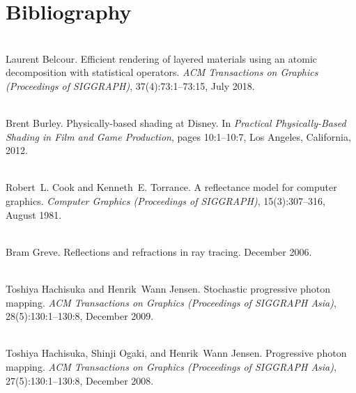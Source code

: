 \chapter{Bibliography}
\hypertarget{citelist}{}\label{citelist}

\begin{DoxyDescription}
\item[\label{citelist_CITEREF_Belcour:2018:Efficient}%
\Hypertarget{citelist_CITEREF_Belcour:2018:Efficient}%
\mbox{[}1\mbox{]}]\hfill \\
Laurent Belcour. Efficient rendering of layered materials using an atomic decomposition with statistical operators. {\itshape ACM Transactions on Graphics (Proceedings of SIGGRAPH)}, 37(4)\+:73\+:1--73\+:15, July 2018. 


\item[\label{citelist_CITEREF_Burley:2012:Physicallybased}%
\Hypertarget{citelist_CITEREF_Burley:2012:Physicallybased}%
\mbox{[}2\mbox{]}]\hfill \\
Brent Burley. Physically-\/based shading at Disney. In {\itshape Practical Physically-\/\+Based Shading in Film and Game Production}, pages 10\+:1--10\+:7, Los Angeles, California, 2012.


\item[\label{citelist_CITEREF_Cook:1981:Reflectance}%
\Hypertarget{citelist_CITEREF_Cook:1981:Reflectance}%
\mbox{[}3\mbox{]}]\hfill \\
Robert~L. Cook and Kenneth~E. Torrance. A reflectance model for computer graphics. {\itshape Computer Graphics (Proceedings of SIGGRAPH)}, 15(3)\+:307--316, August 1981. 


\item[\label{citelist_CITEREF_Greve:2006:Reflections}%
\Hypertarget{citelist_CITEREF_Greve:2006:Reflections}%
\mbox{[}4\mbox{]}]\hfill \\
Bram Greve. Reflections and refractions in ray tracing. December 2006.


\item[\label{citelist_CITEREF_Hachisuka:2009:Stochastic}%
\Hypertarget{citelist_CITEREF_Hachisuka:2009:Stochastic}%
\mbox{[}5\mbox{]}]\hfill \\
Toshiya Hachisuka and Henrik~Wann Jensen. Stochastic progressive photon mapping. {\itshape ACM Transactions on Graphics (Proceedings of SIGGRAPH Asia)}, 28(5)\+:130\+:1--130\+:8, December 2009. 


\item[\label{citelist_CITEREF_Hachisuka:2008:Progressive}%
\Hypertarget{citelist_CITEREF_Hachisuka:2008:Progressive}%
\mbox{[}6\mbox{]}]\hfill \\
Toshiya Hachisuka, Shinji Ogaki, and Henrik~Wann Jensen. Progressive photon mapping. {\itshape ACM Transactions on Graphics (Proceedings of SIGGRAPH Asia)}, 27(5)\+:130\+:1--130\+:8, December 2008. 



\end{DoxyDescription}
